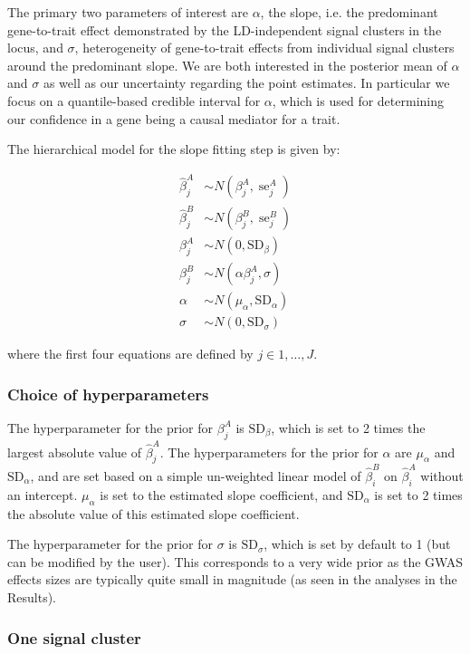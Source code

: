 \documentclass[11pt]{article}
\DeclareMathOperator{\se}{\textrm{se}}
\begin{document}
The primary two parameters of interest are $\alpha$, the slope,
i.e. the predominant gene-to-trait effect demonstrated by the
LD-independent signal clusters in the locus, and $\sigma$,
heterogeneity of gene-to-trait effects from individual signal clusters
around the predominant slope. We are both interested in the posterior
mean of $\alpha$ and $\sigma$ as well as our uncertainty regarding the
point estimates. In particular we focus on a quantile-based credible
interval for $\alpha$, which is used for determining our confidence in
a gene being a causal mediator for a trait.

The hierarchical model for the slope fitting step is given by:

\begin{align}
  \widehat{\beta}_j^A &\sim N(\beta_j^A, \se_j^A) \\
  \widehat{\beta}_j^B &\sim N(\beta_j^B, \se_j^B) \\
  \beta_j^A &\sim N(0, \textrm{SD}_\beta) \\
  \beta_j^B &\sim N(\alpha \beta_j^A, \sigma) \\
  \alpha &\sim N(\mu_\alpha, \textrm{SD}_\alpha) \\
  \sigma &\sim N(0, \textrm{SD}_\sigma)
\end{align}

where the first four equations are defined by $j \in 1,\dots,J$.

\subsubsection{Choice of hyperparameters}

The hyperparameter for the prior for $\beta_j^A$ is
$\textrm{SD}_\beta$, which is set to 2 times the largest absolute value
of $\widehat{\beta}_j^A$.
The hyperparameters for the prior for $\alpha$ are
$\mu_\alpha$ and $\textrm{SD}_\alpha$, and 
are set based on a simple un-weighted linear model of
$\widehat{\beta}_i^B$ on $\widehat{\beta}_i^A$ without an intercept.
$\mu_\alpha$ is set to the estimated slope coefficient, and
$\textrm{SD}_\alpha$ is set to 2 times the absolute value of this
estimated slope coefficient.

The hyperparameter for the prior for $\sigma$ is
$\textrm{SD}_\sigma$, which is set by default to
1 (but can be modified by the user). This corresponds to a very wide
prior as the GWAS effects sizes are typically quite small in magnitude
(as seen in the analyses in the Results).

\subsubsection{One signal cluster}
\end{document}
